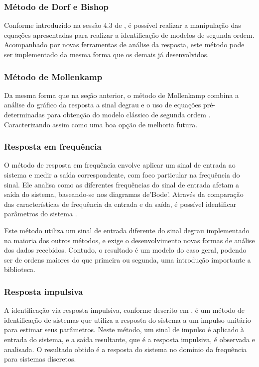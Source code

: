 \subsubsection{Método de Dorf e Bishop}
Conforme introduzido na sessão 4.3 de \cite{CoelhoIdentificacao}, é possível realizar a manipulação das equações
apresentadas para realizar a identificação de modelos de segunda ordem.
Acompanhado por novas ferramentas de análise da resposta, este método pode ser implementado da mesma forma
que os demais já desenvolvidos.

\subsubsection{Método de Mollenkamp}
Da mesma forma que na seção anterior, o método de Mollenkamp combina a análise do gráfico da resposta a sinal degrau
e o uso de equações pré-determinadas para obtenção do modelo clássico de segunda ordem \cite{CoelhoIdentificacao}.
Caracterizando assim como uma boa opção de melhoria futura.

\subsubsection{Resposta em frequência}
O método de resposta em frequência envolve aplicar um sinal de entrada ao sistema e medir a saída correspondente,
com foco particular na frequência do sinal.
Ele analisa como as diferentes frequências do sinal de entrada afetam a saída do sistema, baseando-se nos
diagramas de’Bode’.
Através da comparação das características de frequência da entrada e da saída, é possível identificar parâmetros do
sistema \cite{CoelhoIdentificacao}.

Este método utiliza um sinal de entrada diferente do sinal degrau implementado na maioria dos outros métodos,
e exige o desenvolvimento novas formas de análise dos dados recebidos.
Contudo, o resultado é um modelo do caso geral, podendo ser de ordens maiores do que primeira ou segunda, uma
introdução importante a biblioteca.

\subsubsection{Resposta impulsiva}
A identificação via resposta impulsiva, conforme descrito em \cite{CoelhoIdentificacao}, é um método de identificação
de sistemas que utiliza a resposta do sistema a um impulso unitário para estimar seus parâmetros.
Neste método, um sinal de impulso é aplicado à entrada do sistema, e a saída resultante, que é a resposta impulsiva, é
observada e analisada.
O resultado obtido é a resposta do sistema no domínio da frequência para sistemas discretos.

